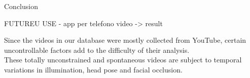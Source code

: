 Conclusion




FUTUREU USE - app per telefono video -> result

 Since the videos in our database were mostly collected from YouTube, certain uncontrollable factors add to the difficulty of their analysis. \\
These totally unconstrained and spontaneous videos are subject to temporal variations in illumination, head pose and facial occlusion.